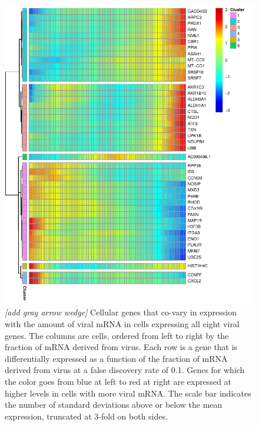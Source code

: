 \documentclass[9pt,lineno]{elife}
\newcommand{\jdbcomment}[1]{\emph{\color{red} [#1]}}
\begin{document}
\begin{figure}[t!]
\centerline{\includegraphics[width=0.63\linewidth]{figures/p_cellular_heatmap.pdf}}
\caption{\label{fig:cellulargenes}
\jdbcomment{add gray arrow wedge}
Cellular genes that co-vary in expression with the amount of viral mRNA in cells expressing all eight viral genes.
The columns are cells, ordered from left to right by the fraction of mRNA derived from virus.
Each row is a gene that is differentially expressed as a function of the fraction of mRNA derived from virus at a false discovery rate of 0.1. 
Genes for which the color goes from blue at left to red at right are expressed at higher levels in cells with more viral mRNA.
The scale bar indicates the number of standard deviations above or below the mean expression, truncated at 3-fold on both sides. 
}





\end{figure}
\end{document}
